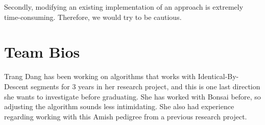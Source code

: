 \documentclass[12pt]{article}
\begin{document}
Secondly, modifying an existing implementation of an approach is extremely time-consuming. Therefore, we would try to be cautious. 

\section{Team Bios}

Trang Dang has been working on algorithms that works with Identical-By-Descent segments for 3 years in her research project, and this is one last direction she wants to investigate before graduating. She has worked with Bonsai before, so adjusting the algorithm sounds less intimidating. She also had experience regarding working with this Amish pedigree from a previous research project.

\printbibliography
\end{document}

